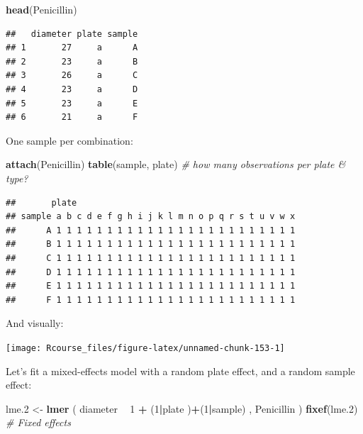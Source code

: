 \documentclass[]{book}
\newenvironment{Shaded}{\begin{snugshade}}{\end{snugshade}}
\newcommand{\KeywordTok}[1]{\textcolor[rgb]{0.13,0.29,0.53}{\textbf{#1}}}
\newcommand{\DecValTok}[1]{\textcolor[rgb]{0.00,0.00,0.81}{#1}}
\newcommand{\StringTok}[1]{\textcolor[rgb]{0.31,0.60,0.02}{#1}}
\newcommand{\CommentTok}[1]{\textcolor[rgb]{0.56,0.35,0.01}{\textit{#1}}}
\newcommand{\OperatorTok}[1]{\textcolor[rgb]{0.81,0.36,0.00}{\textbf{#1}}}
\newcommand{\NormalTok}[1]{#1}
\theoremstyle{definition}
\theoremstyle{definition}
\theoremstyle{definition}
\theoremstyle{remark}
\begin{document}
\begin{Shaded}
\begin{Highlighting}[]
\KeywordTok{head}\NormalTok{(Penicillin)}
\end{Highlighting}
\end{Shaded}

\begin{verbatim}
##   diameter plate sample
## 1       27     a      A
## 2       23     a      B
## 3       26     a      C
## 4       23     a      D
## 5       23     a      E
## 6       21     a      F
\end{verbatim}

One sample per combination:

\begin{Shaded}
\begin{Highlighting}[]
\KeywordTok{attach}\NormalTok{(Penicillin)}
\KeywordTok{table}\NormalTok{(sample, plate) }\CommentTok{# how many observations per plate & type?}
\end{Highlighting}
\end{Shaded}

\begin{verbatim}
##       plate
## sample a b c d e f g h i j k l m n o p q r s t u v w x
##      A 1 1 1 1 1 1 1 1 1 1 1 1 1 1 1 1 1 1 1 1 1 1 1 1
##      B 1 1 1 1 1 1 1 1 1 1 1 1 1 1 1 1 1 1 1 1 1 1 1 1
##      C 1 1 1 1 1 1 1 1 1 1 1 1 1 1 1 1 1 1 1 1 1 1 1 1
##      D 1 1 1 1 1 1 1 1 1 1 1 1 1 1 1 1 1 1 1 1 1 1 1 1
##      E 1 1 1 1 1 1 1 1 1 1 1 1 1 1 1 1 1 1 1 1 1 1 1 1
##      F 1 1 1 1 1 1 1 1 1 1 1 1 1 1 1 1 1 1 1 1 1 1 1 1
\end{verbatim}

And visually:

\texttt{[image: Rcourse\_files/figure-latex/unnamed-chunk-153-1]}

Let's fit a mixed-effects model with a random plate effect, and a random
sample effect:

\begin{Shaded}
\begin{Highlighting}[]
\NormalTok{lme.}\DecValTok{2}\NormalTok{ <-}\StringTok{ }\KeywordTok{lmer}\NormalTok{ ( diameter }\OperatorTok{~}\StringTok{  }\DecValTok{1}  \OperatorTok{+}\StringTok{ }\NormalTok{(}\DecValTok{1}\OperatorTok{|}\NormalTok{plate )}\OperatorTok{+}\NormalTok{(}\DecValTok{1}\OperatorTok{|}\NormalTok{sample) , Penicillin )}
\KeywordTok{fixef}\NormalTok{(lme.}\DecValTok{2}\NormalTok{) }\CommentTok{# Fixed effects}
\end{Highlighting}
\end{Shaded}
\end{document}
